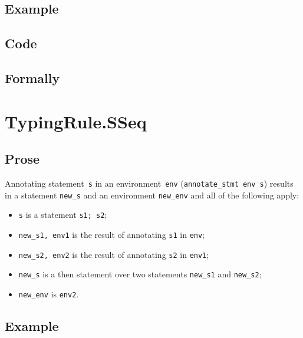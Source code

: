 \documentclass{book}
\begin{document}
  \subsection{Example}

  \subsection{Code}

\begin{emptyformal}
    \subsection{Formally}
\end{emptyformal}


\section{TypingRule.SSeq \label{sec:TypingRule.SSeq}}

  \subsection{Prose}
Annotating statement~\texttt{s} in an environment~\texttt{env}
(\texttt{annotate\_stmt env s}) results in a statement \texttt{new\_s} and an
environment \texttt{new\_env} and all of the following apply:
   \begin{itemize}
   \item \texttt{s} is a statement \texttt{s1; s2};
   \item \texttt{new\_s1, env1} is the result of annotating \texttt{s1} in \texttt{env};
   \item \texttt{new\_s2, env2} is the result of annotating \texttt{s2} in \texttt{env1};
   \item \texttt{new\_s} is a then statement over two statements \texttt{new\_s1} and \texttt{new\_s2};
   \item \texttt{new\_env} is \texttt{env2}.
   \end{itemize}

  \subsection{Example}
\end{document}
